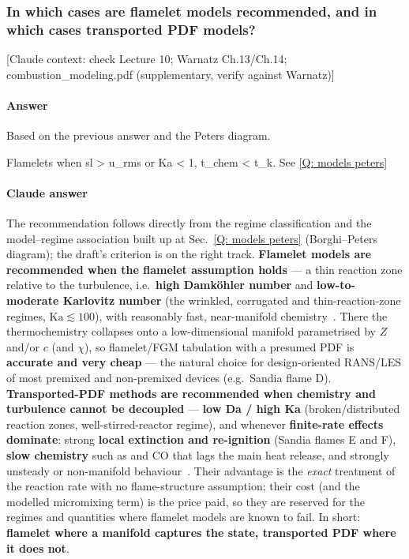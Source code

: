 \subsubsection{In which cases are flamelet models recommended, and in which cases transported PDF models?}

{\color{gray}\footnotesize [Claude context: check Lecture 10; Warnatz Ch.13/Ch.14; combustion\_modeling.pdf (supplementary, verify against Warnatz)]}

\paragraph{Answer} Based on the previous answer and the Peters diagram.

Flamelets when sl > u\_rms or Ka < 1, t\_chem < t\_k. See \ref{Q: models peters}

{\color{istblue}
\paragraph{Claude answer}
The recommendation follows directly from the regime classification and the model--regime association built up at Sec.~\ref{Q: models peters} (Borghi--Peters diagram); the draft's criterion is on the right track. \textbf{Flamelet models are recommended when the flamelet assumption holds} --- a thin reaction zone relative to the turbulence, i.e.\ \textbf{high Damk\"ohler number} and \textbf{low-to-moderate Karlovitz number} (the wrinkled, corrugated and thin-reaction-zone regimes, $\mathrm{Ka}\lesssim 100$), with reasonably fast, near-manifold chemistry~\cite{lecture10,peters2000turbulent,veynante2002turbulent}. There the thermochemistry collapses onto a low-dimensional manifold parametrised by $Z$ and/or $c$ (and $\chi$), so flamelet/FGM tabulation with a presumed PDF is \textbf{accurate and very cheap} --- the natural choice for design-oriented RANS/LES of most premixed and non-premixed devices (e.g.\ Sandia flame D). \textbf{Transported-PDF methods are recommended when chemistry and turbulence cannot be decoupled} --- \textbf{low Da / high Ka} (broken/distributed reaction zones, well-stirred-reactor regime), and whenever \textbf{finite-rate effects dominate}: strong \textbf{local extinction and re-ignition} (Sandia flames E and F), \textbf{slow chemistry} such as  and CO that lags the main heat release, and strongly unsteady or non-manifold behaviour~\cite{lecture10,pope2000turbulent,veynante2002turbulent}. Their advantage is the \emph{exact} treatment of the reaction rate with no flame-structure assumption; their cost (and the modelled micromixing term) is the price paid, so they are reserved for the regimes and quantities where flamelet models are known to fail. In short: \textbf{flamelet where a manifold captures the state, transported PDF where it does not}.
}





